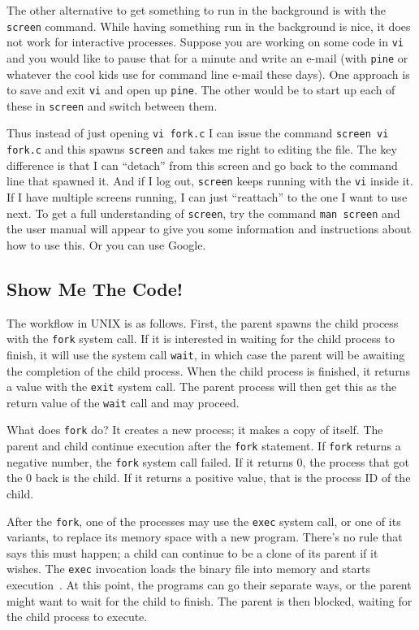 \documentclass[a4paper]{report}
\begin{document}
The other alternative to get something to run in the background is with the \texttt{screen} command. While having something run in the background is nice, it does not work for interactive processes. Suppose you are working on some code in \texttt{vi} and you would like to pause that for a minute and write an e-mail (with \texttt{pine} or whatever the cool kids use for command line e-mail these days). One approach is to save and exit \texttt{vi} and open up \texttt{pine}. The other would be to start up each of these in \texttt{screen} and switch between them.

Thus instead of just opening \texttt{vi fork.c} I can issue the command \texttt{screen vi fork.c} and this spawns \texttt{screen} and takes me right to editing the file. The key difference is that I can ``detach'' from this screen and go back to the command line that spawned it. And if I log out, \texttt{screen} keeps running with the \texttt{vi} inside it. If I have multiple screens running, I can just ``reattach'' to the one I want to use next. To get a full understanding of \texttt{screen}, try the command \texttt{man screen} and the user manual will appear to give you some information and instructions about how to use this. Or you can use Google.


\subsection*{Show Me The Code!}

The workflow in UNIX is as follows. First, the parent spawns the child process with the \texttt{fork} system call. If it is interested in waiting for the child process to finish, it will use the system call \texttt{wait}, in which case the parent will be awaiting the completion of the child process. When the child process is finished, it returns a value with the \texttt{exit} system call. The parent process will then get this as the return value of the \texttt{wait} call and may proceed.

What does \texttt{fork} do? It creates a new process; it makes a copy of itself. The parent and child continue execution after the \texttt{fork} statement. If \texttt{fork} returns a negative number, the \texttt{fork} system call failed. If it returns 0, the process that got the 0 back is the child. If it returns a positive value, that is the process ID of the child.

After the \texttt{fork}, one of the processes may use the \texttt{exec} system call, or one of its variants, to replace its memory space with a new program. There's no rule that says this must happen; a child can continue to be a clone of its parent if it wishes. The \texttt{exec} invocation loads the binary file into memory and starts execution~\cite{osc}. At this point, the programs can go their separate ways, or the parent might want to wait for the child to finish. The parent is then blocked, waiting for the child process to execute.
\end{document}
